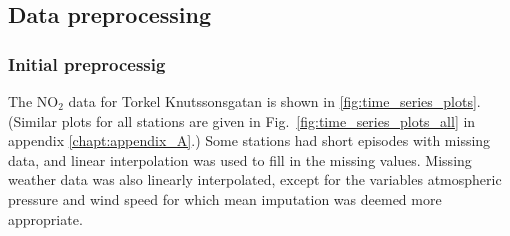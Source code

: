 
\subsection{Data preprocessing}
\subsubsection{Initial preprocessig}
The NO$_2$ data for Torkel Knutssonsgatan is shown in \vref{fig:time_series_plots}. (Similar plots for all stations are given in Fig.\ \ref{fig:time_series_plots_all} in appendix \ref{chapt:appendix_A}.)
Some stations had short episodes with missing data, and linear interpolation was used to fill in the missing values. Missing weather data was also linearly interpolated, except for the variables atmospheric pressure and wind speed for which mean imputation was deemed more appropriate. 

